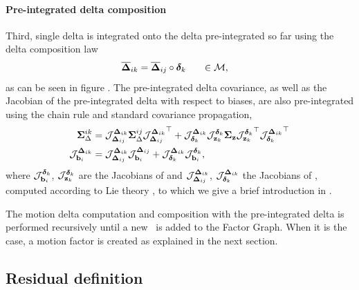 \paragraph{Pre-integrated delta composition}
Third, single delta is integrated onto the delta pre-integrated so far using the delta composition law
%
\begin{align}
    \overline{{{\bm \Delta}}}_{ik} &= \overline{{{\bm \Delta}}}_{ij} \circ \bm\delta_k ~~~~~\in \mathcal{M},
    \label{eq:deltaPlusDelta}
\end{align}
%
as can be seen in figure .
The pre-integrated delta covariance, as well as the Jacobian of the pre-integrated delta with respect to biases, are also pre-integrated using the chain rule and standard covariance propagation,
%
\begin{align}
    {\bm \Sigma}_\Delta^{ik} &= {\mathcal{J}^{{{\bm \Delta}}_{ik}}_{{{\bm \Delta}}_{ij}}}{\bm \Sigma}_\Delta^{ij}{\mathcal{J}^{{{\bm \Delta}}_{ik}}_{{{\bm \Delta}}_{ij}}}^{\top} 
    + {\mathcal{J}^{{{\bm \Delta}}_{ik}}_{\bm\delta_k}}{\mathcal{J}^{\bm\delta_k}_{{\bf z}_k}}{\bm \Sigma}_{\bf z}{\mathcal{J}^{\bm\delta_k}_{{\bf z}_k}}^{\top}{\mathcal{J}^{{{\bm \Delta}}_{ik}}_{\bm\delta_k}}^{\top}
    \\
    {\mathcal{J}^{{{\bm \Delta}}_{ik}}_{{\bf b}_i}} &= {\mathcal{J}^{{{\bm \Delta}}_{ik}}_{{{\bm \Delta}}_{ij}}}{\mathcal{J}^{{{\bm \Delta}}_{ij}}_{{\bf b}_i}} 
    + {\mathcal{J}^{{{\bm \Delta}}_{ik}}_{\bm\delta_k}}{\mathcal{J}^{\bm\delta_k}_{{\bf b}_i}} ,
\end{align}
%
where ${\mathcal{J}^{\bm\delta_k}_{{\bf b}_i}}$, ${\mathcal{J}^{\bm\delta_k}_{{\bf z}_k}}$ are the Jacobians of  and ${\mathcal{J}^{{{\bm \Delta}}_{ik}}_{{{\bm \Delta}}_{ij}}}$, ${\mathcal{J}^{{{\bm \Delta}}_{ik}}_{\bm\delta_k}}$ the Jacobians of , computed according to Lie theory \cite{sola2018micro}, to which we give a brief introduction in .

The motion delta computation and composition with the pre-integrated delta is performed recursively until a new \keyframe\ is added to the Factor Graph. When it 
is the case, a motion factor is created as explained in the next section.


\subsection{Residual definition}
\label{sec:preint_residual}

